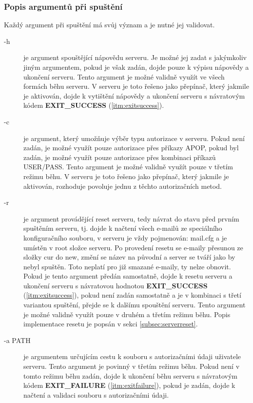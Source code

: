 \documentclass[11pt,a4paper]{report}
\begin{document}
    \subsubsection{Popis argumentů při spuštění}
    Každý argument při spuštění má svůj význam a je nutné jej validovat. \par

    \begin{description}
        \item [-h] \label{itm:helpparam} je argument spouštějící nápovědu serveru. Je možné jej zadat s jakýmkoliv jiným argumentem, pokud je však zadán, dojde pouze k výpisu nápovědy a ukončení serveru. Tento argument je možné validně využít ve všech formách běhu serveru.
        V serveru je toto řešeno jako přepínač, který jakmile je aktivován, dojde k vytištění nápovědy a ukončení serveru s návratovým kódem \textbf{EXIT\_SUCCESS} (\ref{itm:exitsuccess}).
        \item [-c] \label{itm:authorisationparam}je argument, který umožňuje výběr typu autorizace v serveru. Pokud není zadán, je možné využít pouze autorizace přes příkazy APOP, pokud byl zadán, je možné využít pouze autorizace přes kombinaci příkazů USER/PASS. Tento argument je možné validně využít pouze v třetím režimu běhu.
        V serveru je toto řešeno jako přepínač, který jakmile je aktivován, rozhoduje povoluje jednu z těchto autorizačních metod.
        \item [-r] \label{itm:resetparam}je argument provádějící reset serveru, tedy návrat do stavu před prvním spuštěním serveru, tj. dojde k načtení všech e-mailů ze speciálního konfiguračního souboru, v serveru je vždy pojmenován: mail.cfg a je umístěn v root složce serveru. Po provedení resetu se e-maily přesunou ze složky cur do new, změní se název na původní a server se tváří jako by nebyl spuštěn. Toto neplatí pro již smazané e-maily, ty nelze obnovit. Pokud je tento argument předán samostatně, dojde k resetu serveru a ukončení serveru s návratovou hodnotou \textbf{EXIT\_SUCCESS} (\ref{itm:exitsuccess}), pokud není zadán samostatně a je v kombinaci s třetí variantou spuštění, přejde se k dalšímu spouštění serveru. Tento argument je možné validně využít pouze v druhém a třetím režimu běhu. Popis implementace resetu je popsán v sekci \ref{subsec:serverreset}.
        \item [-a PATH] je argumentem určujícím cestu k souboru s autorizačními údaji uživatele serveru. Tento argument je povinný v třetím režimu běhu. Pokud není v tomto režimu běhu zadán, dojde k ukončení běhu serveru s návratovým kódem \textbf{EXIT\_FAILURE} (\ref{itm:exitfailure}), pokud je zadán, dojde k načtení a validaci souboru s autorizačními údaji.

\end{description}
\end{document}
